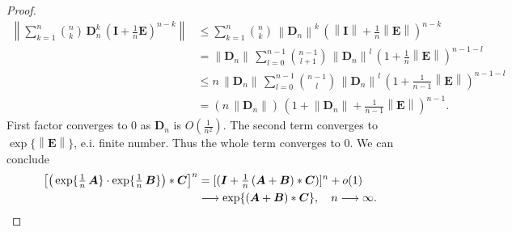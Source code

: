 \begin{appendices}
\begin{proof}
\begin{align*}
\left\|\sum_{k=1}^n {{n}\choose{k}}\,\bm{D}_n^k\,\left(\bm{I}+\tfrac{1}{n}\bm{E}\right)^{n-k}\right\|
&\leq \sum_{k=1}^n {{n}\choose{k}}\,\left\|\bm{D}_n\right\|^k\,\left(\left\|\bm{I}\right\|+\tfrac{1}{n}\left\|\bm{E}\right\|\right)^{n-k}\\
&=\left\|\bm{D}_n\right\|\,\sum_{l=0}^{n-1} {{n-1}\choose{l+1}}\,\left\|\bm{D}_n\right\|^l\,\left(1+\tfrac{1}{n}\left\|\bm{E}\right\|\right)^{n-1-l}\\
&\leq n\,\left\|\bm{D}_n\right\|\,\sum_{l=0}^{n-1} {{n-1}\choose{l}}\,\left\|\bm{D}_n\right\|^l\,\left(1+\tfrac{1}{n-1}\left\|\bm{E}\right\|\right)^{n-1-l}\\
&=(n\,\left\|\bm{D}_n\right\|)\,(1+\left\|\bm{D}_n\right\|+\tfrac{1}{n-1}\left\|\bm{E}\right\|)^{n-1}.  
\end{align*}
First factor converges to $0$ as $\bm{D}_n$ is $O(\tfrac{1}{n^2})$. The second term converges to $\exp\{\left\|\bm{E}\right\|\}$, e.i. finite number. Thus the whole term converges to $0$. 
We can conclude
\begin{align*}
\left[\big(\exp\{\tfrac{1}{n}\,\mbox{\boldmath{$A$}}\}\cdot\exp\{\tfrac{1}{n}\,\mbox{\boldmath{$B$}}\}\big)\ast \mbox{\boldmath{$C$}}\right]^n&=[(\mbox{\boldmath{$I$}}+\tfrac{1}{n}\,(\mbox{\boldmath{$A$}}+\mbox{\boldmath{$B$}})\ast\mbox{\boldmath{$C$}})]^n+o(1)\\
&\longrightarrow\exp\{(\mbox{\boldmath{$A$}}+\mbox{\boldmath{$B$}})\ast\mbox{\boldmath{$C$}}\},\quad n\longrightarrow\infty.\qedhere
\end{align*}
\end{proof}


\end{appendices}
